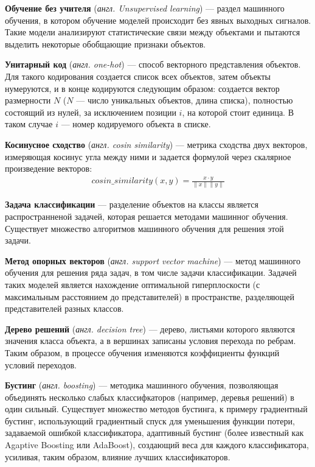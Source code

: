 \documentclass[times,specification,annotation]{itmo-student-thesis}
\begin{document}
\textbf{Обучение без учителя} (\textit{англ. Unsupervised learning}) --- раздел машинного обучения, в котором обучение моделей происходит без явных выходных сигналов. Такие модели анализируют статистические связи между объектами и пытаются выделить некоторые обобщающие признаки объектов.

\textbf{Унитарный код} (\textit{англ. one-hot}) --- способ векторного представления объектов. Для такого кодирования создается список всех объектов, затем объекты нумеруются, и в конце кодируются следующим образом: создается вектор размерности $N$ ($N$ --- число уникальных объектов, длина списка), полностью состоящий из нулей, за исключением позиции $i$, на которой стоит единица. В таком случае $i$ --- номер кодируемого объекта в списке. 

\textbf{Косинусное сходство} (\textit{англ. cosin similarity}) --- метрика сходства двух векторов, измеряющая косинус угла между ними и задается формулой через скалярное произведение векторов:
 \begin{align*}
 cosin\_similarity(x, y) = \frac{x \cdot y}{\lVert x \rVert \lVert y \rVert} 
 \end{align*}
 
\textbf{Задача классификации} --- разделение объектов на классы является распространненой задачей, которая решается методами машинног обучения. Существует множество алгоритмов машинного обучения для решения этой задачи.

\textbf{Метод опорных векторов} \cite{cortest1995} (\textit{англ. support vector machine})  --- метод машинного обучения для решения ряда задач, в том числе задачи классификации. Задачей таких моделей является нахождение оптимальной гиперплоскости (с максимальным расстоянием до представителей) в пространстве, разделяющей представителей разных классов. 

\textbf{Дерево решений} \cite{quinlan1986induction} (\textit{англ. decision tree}) --- дерево, листьями которого являются значения класса объекта, а в вершинах записаны условия перехода по ребрам. Таким образом, в процессе обучения изменяются коэффициенты функций условий переходов.   

\textbf{Бустинг} (\textit{англ. boosting}) --- методика машинного обучения, позволяющая объединять несколько слабых классифкаторов (например, деревья решений) в один сильный. Существует множество методов бустинга, к примеру градиентный бустинг\cite{friedman2002stochastic}, использующий градиентный спуск для уменьшения функции потери, задаваемой ошибкой классификатора, адаптивный бустинг (более известный как Agaptive Boosting или AdaBoost)\cite{freund1997decision}, создающий веса для каждого классификатора, усиливая, таким образом, влияние лучших классификаторов.  
\end{document}
